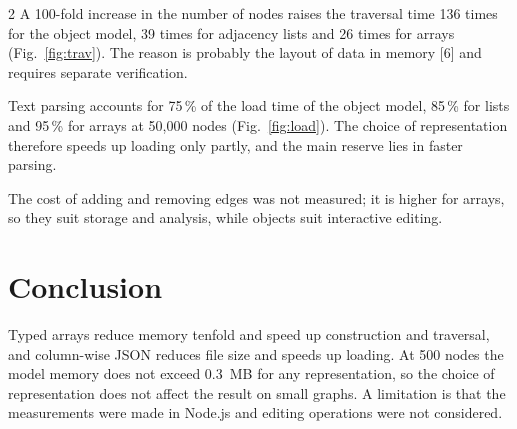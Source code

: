 \documentclass[a4paper,10pt,twoside]{article}
\begin{document}
\begin{multicols}{2}
A 100-fold increase in the number of nodes raises the traversal time 136 times for the object model, 39 times for adjacency lists and 26 times for arrays (Fig.~\ref{fig:trav}). The reason is probably the layout of data in memory [6] and requires separate verification.


Text parsing accounts for 75\,\% of the load time of the object model, 85\,\% for lists and 95\,\% for arrays at 50,000 nodes (Fig.~\ref{fig:load}). The choice of representation therefore speeds up loading only partly, and the main reserve lies in faster parsing.


The cost of adding and removing edges was not measured; it is higher for arrays, so they suit storage and analysis, while objects suit interactive editing.

\section*{Conclusion}
Typed arrays reduce memory tenfold and speed up construction and traversal, and column-wise JSON reduces file size and speeds up loading. At 500 nodes the model memory does not exceed 0.3~MB for any representation, so the choice of representation does not affect the result on small graphs. A limitation is that the measurements were made in Node.js and editing operations were not considered.


\end{multicols} %

\end{document}
